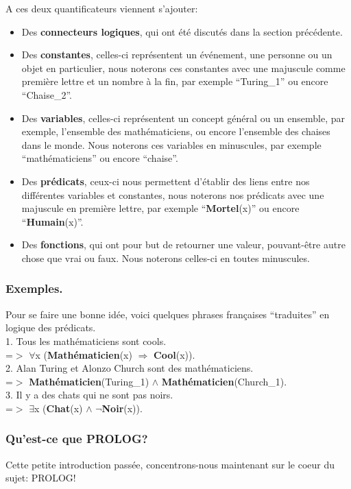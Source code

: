 \documentclass[a4paper, 12pt]{article}
\newcommand{\imply}{\Rightarrow}
\numberwithin{equation}{subsection}
\begin{document}
A ces deux quantificateurs viennent s'ajouter:
\begin{itemize}
  \item Des {\bf connecteurs logiques}, qui ont été discutés dans la section précédente.
  \item Des {\bf constantes}, celles-ci représentent un événement, une personne ou un objet en particulier, nous noterons ces constantes avec une majuscule comme première lettre et un nombre à la fin, par exemple ``Turing\_1'' ou encore ``Chaise\_2''.
  \item Des {\bf variables}, celles-ci représentent un concept général ou un ensemble, par exemple, l'ensemble des mathématiciens, ou encore l'ensemble des chaises dans le monde. Nous noterons ces variables en minuscules, par exemple ``mathématiciens'' ou encore ``chaise''.
  \item Des {\bf prédicats}, ceux-ci nous permettent d'établir des liens entre nos différentes variables et constantes, nous noterons nos prédicats avec une majuscule en première lettre, par exemple ``{\bf Mortel}(x)'' ou encore ``{\bf Humain}(x)''.
  \item Des {\bf fonctions}, qui ont pour but de retourner une valeur, pouvant-être autre chose que vrai ou faux. Nous noterons celles-ci en toutes minuscules.
\end{itemize}

\subsubsection{Exemples.}
Pour se faire une bonne idée, voici quelques phrases françaises ``traduites'' en logique des prédicats. \\[0.5cm]
1. Tous les mathématiciens sont cools. \\
=$>$ $\forall$x ({\bf Mathématicien}(x) $\imply$ {\bf Cool}(x)). \\[0.2cm]
2. Alan Turing et Alonzo Church sont des mathématiciens. \\
=$>$ {\bf Mathématicien}(Turing\_1) $\land$ {\bf Mathématicien}(Church\_1). \\[0.2cm]
3. Il y a des chats qui ne sont pas noirs. \\
=$>$ $\exists$x ({\bf Chat}(x) $\land$ $\neg${\bf Noir}(x)). \\[0.2cm]

\subsubsection{Qu'est-ce que PROLOG?}
Cette petite introduction passée, concentrons-nous maintenant sur le coeur du sujet: PROLOG! \\
\end{document}
